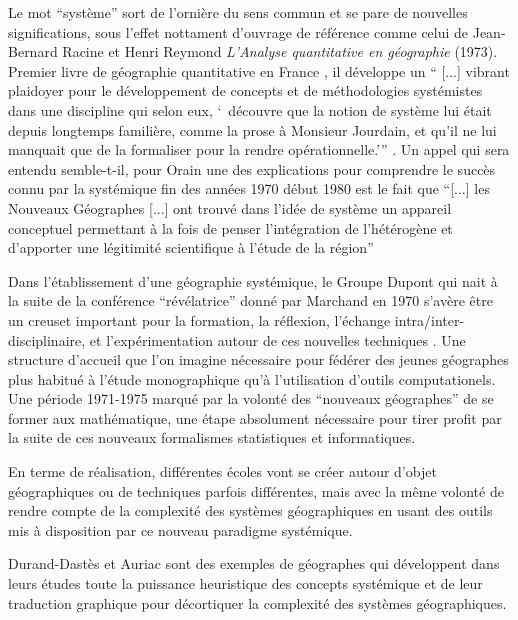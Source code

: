 Le mot \enquote{système} sort de l'ornière du sens commun et se pare de nouvelles significations, sous l'effet nottament d'ouvrage de référence comme celui de Jean-Bernard Racine et Henri Reymond  \textit{L’Analyse quantitative en géographie} (1973). Premier livre de géographie quantitative en France \autocite{Cauvin2007}, il développe un \enquote{ [...] vibrant plaidoyer pour le développement de concepts et de méthodologies systémistes dans une discipline qui selon eux, \enquote{ découvre que la notion de système lui était depuis longtemps familière, comme la prose à Monsieur Jourdain, et qu'il ne lui manquait que de la formaliser pour la rendre opérationnelle.}} \textcite{Orain2001}. Un appel qui sera entendu semble-t-il, pour Orain \autocite[23]{Orain2001} une des explications pour comprendre le succès connu par la systémique fin des années 1970 début 1980 est le fait que \enquote{[...] les Nouveaux Géographes [...] ont trouvé dans l’idée de système un appareil conceptuel permettant à la fois de penser l’intégration de l’hétérogène et d’apporter une légitimité scientifique à l’étude de la région} 


Dans l'établissement d'une géographie systémique, le Groupe Dupont qui nait à la suite de la conférence \enquote{révélatrice} donné par Marchand en 1970 s'avère être un creuset important pour la formation, la réflexion, l'échange intra/inter-disciplinaire, et l'expérimentation autour de ces nouvelles techniques \autocites[2]{LeBerre1987}[125-128]{Pumain2002}. Une structure d'accueil que l'on imagine nécessaire pour fédérer des jeunes géographes plus habitué à l'étude monographique qu'à l'utilisation d'outils computationels. Une période 1971-1975 marqué par la volonté des \enquote{nouveaux géographes} de se former aux mathématique, une étape absolument nécessaire pour tirer profit par la suite de ces nouveaux formalismes statistiques et informatiques. 

En terme de réalisation, différentes écoles vont se créer autour d'objet géographiques ou de techniques parfois différentes, mais avec la même volonté de rendre compte de la complexité des systèmes géographiques en usant des outils mis à disposition par ce nouveau paradigme systémique. 

Durand-Dastès et Auriac sont des exemples de géographes qui développent dans leurs études toute la puissance heuristique des concepts systémique et de leur traduction graphique pour décortiquer la complexité des systèmes géographiques.

